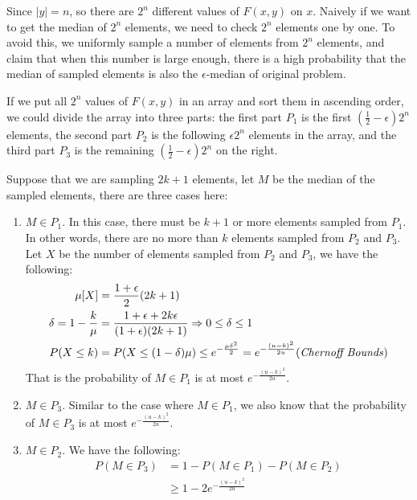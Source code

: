 \documentclass[paper=a4, fontsize=11pt]{scrartcl} %
\numberwithin{equation}{section} %
\numberwithin{figure}{section} %
\numberwithin{table}{section} %
\begin{document}
Since $|y| = n$, so there are $2^n$ different values of $F(x, y)$ on $x$. 
Naively if we want to get the median of $2^n$ elements, we need to check $2^n$ elements one by one.
To avoid this, we uniformly sample a number of elements from $2^n$ elements, and claim that when
this number is large enough, there is a high probability that the median of sampled elements is also
the $\epsilon$-median of original problem.

If we put all $2^n$ values of $F(x, y)$ in an array and sort them in ascending order, we could
divide the array into three parts: the first part $P_1$ is the first $(\frac{1}{2}-\epsilon) 2^n$
elements, the second part $P_2$ is the following $\epsilon 2^n$ elements in the array, and the third
part $P_3$ is the remaining $(\frac{1}{2}-\epsilon) 2^n$ on the right.

Suppose that we are sampling $2k+1$ elements, let $M$ be the median of the sampled elements, there
are three cases here:
\begin{enumerate}
  \item $M \in P_1$. In this case, there must be $k+1$ or more elements sampled from $P_1$. In other
    words, there are no more than $k$ elements sampled from $P_2$ and $P_3$. Let $X$ be the number of
    elements sampled from $P_2$ and $P_3$, we have the following:
    \begin{align}
      \mu[X] & = \frac{1 + \epsilon}{2} (2k+1) \\
      \delta = 1 - \frac{k}{\mu} &= \frac{1 + \epsilon + 2k\epsilon}{(1+\epsilon)(2k+1)} \Rightarrow 
      0 \leq \delta \leq 1\\
      P(X \leq k) &= P(X \leq (1 - \delta) \mu) \leq e^{-\frac{\mu \delta^2}{2}} 
      = e^{-\frac{(u-k)^2}{2u}} (\text{\textit{Chernoff Bounds}}) 
    \end{align}
    That is the probability of $M \in P_1$ is at most $e^{-\frac{(u-k)^2}{2u}}$. 
  \item $M \in P_3$. Similar to the case where $M \in P_1$, we also know that the probability of $M
    \in P_3$ is at most $e^{-\frac{(u-k)^2}{2u}}$. 
  \item $M \in P_2$. We have the following:
    \begin{align}
    P(M \in P_3) &= 1 - P(M \in P_1) - P(M \in P_2) \\
    &\geq 1 - 2 e^{-\frac{(u-k)^2}{2u}}
    \end{align}
\end{enumerate}
\end{document}
